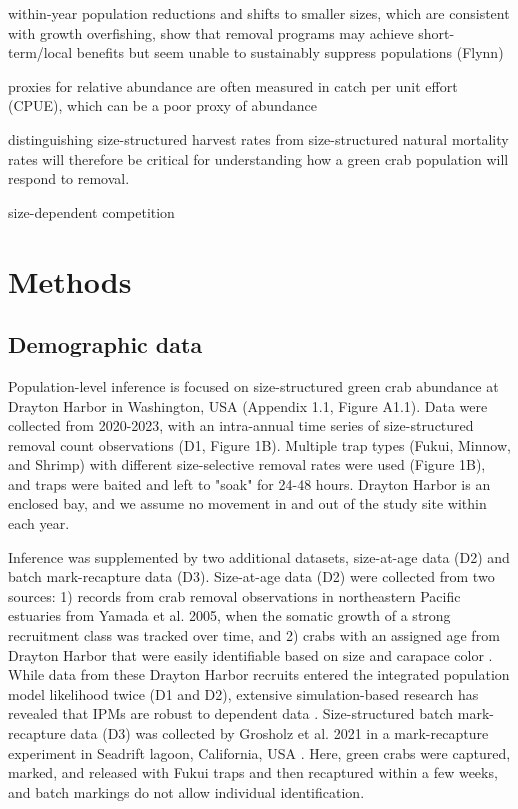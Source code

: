 \documentclass{article}
\begin{document}
within-year population reductions and shifts to smaller sizes, which are consistent with growth overfishing, show that removal programs may achieve short-term/local benefits but seem unable to sustainably suppress populations (Flynn)

proxies for relative abundance are often measured in catch per unit effort (CPUE), which can be a poor proxy of  abundance

distinguishing size-structured harvest rates from size-structured natural mortality rates will therefore be critical for understanding how a green crab population will respond to removal.

size-dependent competition

\section{Methods}

\subsection{Demographic data}

Population-level inference is focused on size-structured green crab abundance at Drayton Harbor in Washington, USA (Appendix 1.1, Figure A1.1). Data were collected from 2020-2023, with an intra-annual time series of size-structured removal count observations (D1, Figure 1B). Multiple trap types (Fukui, Minnow, and Shrimp) with different size-selective removal rates were used (Figure 1B), and traps were baited and left to "soak" for 24-48 hours. Drayton Harbor is an enclosed bay, and we assume no movement in and out of the study site within each year. 

Inference was supplemented by two additional datasets, size-at-age data (D2) and batch mark-recapture data (D3). Size-at-age data (D2) were collected from two sources: 1) records from crab removal observations in northeastern Pacific estuaries from Yamada et al. 2005, when the somatic growth of a strong recruitment class was tracked over time, and 2) crabs with an assigned age from Drayton Harbor that were easily identifiable based on size and carapace color \parencite{yamada2005growth}. While data from these Drayton Harbor recruits entered the integrated population model likelihood twice (D1 and D2), extensive simulation-based research has revealed that IPMs are robust to dependent data \parencite{abadi2010assessment}. Size-structured batch mark-recapture data (D3) was collected by Grosholz et al. 2021 in a mark-recapture experiment in Seadrift lagoon, California, USA \parencite{grosholz2021stage}. Here, green crabs were captured, marked, and released with Fukui traps and then recaptured within a few weeks, and batch markings do not allow individual identification. 
\end{document}
